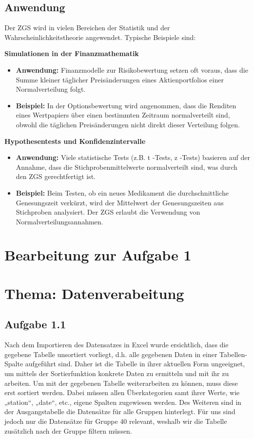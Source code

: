 \documentclass[a4paper, 12pt]{article}
\begin{document}
\subsection{Anwendung}Der ZGS wird in vielen Bereichen der Statistik und der Wahrscheinlichkeitstheorie angewendet. Typische Beispiele sind:

\newpage
\textbf{Simulationen in der Finanzmathematik}
\begin{itemize}
    \item
    \textbf{Anwendung:} Finanzmodelle zur Risikobewertung setzen oft voraus, dass die Summe kleiner täglicher Preisänderungen eines Aktienportfolios einer Normalverteilung folgt.

    \item 
    \textbf{Beispiel:} In der Optionsbewertung wird angenommen, dass die Renditen eines Wertpapiers über einen bestimmten Zeitraum normalverteilt sind, obwohl die täglichen Preisänderungen nicht direkt dieser Verteilung folgen.
\end{itemize}

\textbf{Hypothesentests und Konfidenzintervalle}
\begin{itemize}
    \item
    \textbf{Anwendung:} Viele statistische Tests (z.B. t -Tests,  z -Tests) basieren auf der Annahme, dass die Stichprobenmittelwerte normalverteilt sind, was durch den ZGS gerechtfertigt ist.

    \item
    \textbf{Beispiel:} Beim Testen, ob ein neues Medikament die durchschnittliche Genesungszeit verkürzt, wird der Mittelwert der Genesungszeiten aus Stichproben analysiert. Der ZGS erlaubt die Verwendung von Normalverteilungsannahmen.
\end{itemize}

\newpage

\section{Bearbeitung zur Aufgabe 1}
\section*{Thema: Datenverabeitung}
\subsection{Aufgabe 1.1}
Nach dem Importieren des Datensatzes in Excel wurde ersichtlich, dass die gegebene Tabelle unsortiert vorliegt, d.h. alle gegebenen Daten in einer Tabellen-Spalte aufgeführt sind. Daher ist die Tabelle in ihrer aktuellen Form ungeeignet, um mittels der Sortierfunktion konkrete Daten zu ermitteln und mit ihr zu arbeiten.
\newline
Um mit der gegebenen Tabelle weiterarbeiten zu können, muss diese erst sortiert werden. Dabei müssen allen Überkategorien samt ihrer Werte, wie „station“, „date“, etc., eigene Spalten zugewiesen werden. Des Weiteren sind in der Ausgangstabelle die Datensätze für alle Gruppen hinterlegt. Für uns sind jedoch nur die Datensätze für Gruppe 40 relevant, weshalb wir die Tabelle zusätzlich nach der Gruppe filtern müssen.
\end{document}

